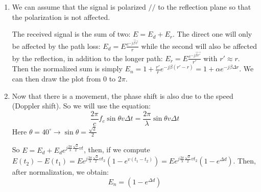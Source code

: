 
\begin{solution}
	\begin{enumerate}
	\item
		We can assume that the signal is polarized $//$ to the reflection plane so that the polarization is not affected.
		
		
		The received signal is the sum of two: $E = E_d + E_r$. The direct one will only be affected by the path loss:  $E_d = E\frac{e^{-j\vec{\beta} \vec{r}}}{r}$ while the second will also be affected by the reflection, in addition to the longer path:
		$E_r = E\frac{e^{-j\vec{\beta} \vec{r'}}}{r'}$ with $r' \approx r$.
		Then the normalized sum is simply $E_n = 1 + \frac{r'}{r}e^{-j\beta(r' - r)} =  1 + \alpha e^{-j\beta\Delta r}$. We can then draw the plot from $0$ to $2\pi$.
		
		
	\item Now that there is a movement, the phase shift is also due to the speed (Doppler shift). So we will use the equation:
	$$ \frac{2\pi}{c}f_c \sin \theta v \Delta t = \frac{2\pi}{\lambda} \sin \theta v \Delta t$$
	Here $\theta = 40^\circ \rightarrow \sin \theta = \frac{\sqrt{2}}{2}$
	
	So $E = E_d + E_d e^{j\frac{2\pi}{\lambda}\frac{\sqrt{2}}{2}v t}$, then, if we compute $E(t_2) - E(t_1) = E e^{j \frac{2\pi}{\lambda} \frac{\sqrt{2}}{2} v t_2} (1 - e^{v (t_1 - t_2)}) = E e^{j \frac{2\pi}{\lambda} \frac{\sqrt{2}}{2}v t_2}(1 - e^{\Delta d})$.
	Then, after normalization, we obtain:
	$$E_n = (1 - e^{\Delta d})$$
	
	\end{enumerate} 
\end{solution}

